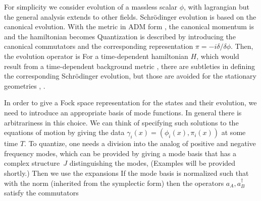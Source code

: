 
For simplicity we consider evolution of a massless scalar $\phi$, with lagrangian
%
\eqn{}
%
but the general analysis extends to other fields.  Schr\"odinger evolution is based on the canonical evolution.  With the metric in ADM form \admmet, the canonical momentum is
%
\eqn{}
%
and the hamiltonian becomes
%
\eqn{}
%
Quantization is described by introducing the canonical commutators
%
\eqn{}
and the corresponding representation $\pi=-i\delta/\delta\phi$.  Then, the evolution operator is
%
\eqn{}
%
For a time-dependent hamiltonian $H$, which would result from a time-dependent background metric \admmet, there are subtleties in defining the corresponding Schr\"odinger evolution, but those are avoided for the stationary geometries \admmet, \admvars.

In order to give a Fock space representation for the states and their evolution, we need to introduce an appropriate basis of mode functions.  In general there is arbitrariness in this choice.  We can think of specifying such solutions to the equations of motion by giving the data $\gamma_i(x)= (\phi_i(x), \pi_i(x))$ at some time $T$.  To quantize, one needs a division into the analog of positive and negative frequency modes, which can be provided by giving a mode basis that has a complex structure\ $J$ distinguishing the modes,
%
\eqn{}
%  
(Examples will be provided shortly.)  Then we use the expansions
%
\eqn{}
%
 If the mode basis is normalized such that
%
\eqn{}
%
with the norm (inherited from the symplectic form)
%
\eqn{}
%
then the operators $a_A,a_B^\dagger$ satisfy the commutators
%
\eqn{}
%

